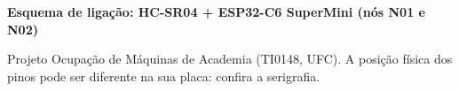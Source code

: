 \documentclass[10pt,a4paper,landscape]{article}
\begin{document}
\begin{center}
{\large\bfseries Esquema de ligação: HC-SR04 + ESP32-C6 SuperMini (nós N01 e N02)}\par\medskip
\resizebox{\textwidth}{!}{}\par\medskip
{\footnotesize Projeto Ocupação de Máquinas de Academia (TI0148, UFC). A posição física dos pinos pode ser diferente na sua placa: confira a serigrafia.\par}
\end{center}
\end{document}
